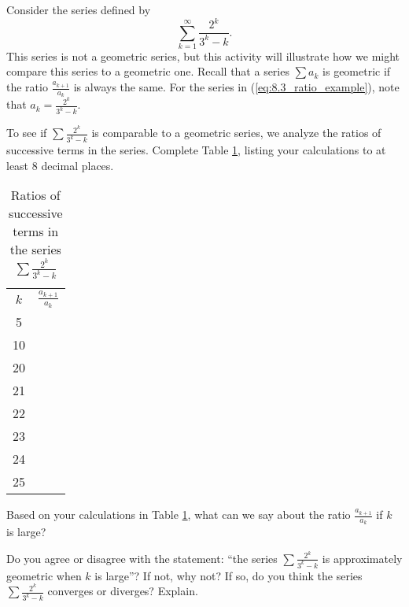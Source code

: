 \begin{activity} \label{8.3.Act8} Consider the series defined by
\begin{equation} \label{eq:8.3_ratio_example}
\sum_{k=1}^{\infty} \frac{2^k}{3^k-k}.
\end{equation}
This series is not a geometric series, but this activity will illustrate how we might compare this series to a geometric one. Recall that a series $\sum a_k$ is geometric if the ratio $\frac{a_{k+1}}{a_k}$ is always the same. For the series in (\ref{eq:8.3_ratio_example}), note that $a_k = \frac{2^k}{3^k-k}$.
\ba
\item  To see if $\sum \frac{2^k}{3^k-k}$ is comparable to a geometric series, we analyze the ratios of successive terms in the series. Complete Table \ref{T:8.3.3_ratio_test}, listing your calculations to at least 8 decimal places.
\begin{table}[ht]
\begin{center}
\renewcommand{\arraystretch}{1.5}
\begin{tabular}{c|p{2in}}
$k$   & $\frac{a_{k+1}}{a_k}$ \\
5   & \\
10   &  \\
20   &  \\
21   &  \\
22   &  \\
23  & \\
24   &  \\
25   &  \\
\end{tabular}
\label{T:8.3.3_ratio_test}
\caption{Ratios of successive terms in the series $\sum \frac{2^k}{3^k-k}$}
\end{center}
\end{table}

\item Based on your calculations in Table \ref{T:8.3.3_ratio_test}, what can we say about the ratio $\frac{a_{k+1}}{a_k}$ if $k$ is large?

\item Do you agree or disagree with the statement: ``the series $\sum \frac{2^k}{3^k-k}$ is approximately geometric when $k$ is large''? If not, why not? If so, do you think the series $\sum \frac{2^k}{3^k-k}$ converges or diverges? Explain.



\ea
\end{activity}

